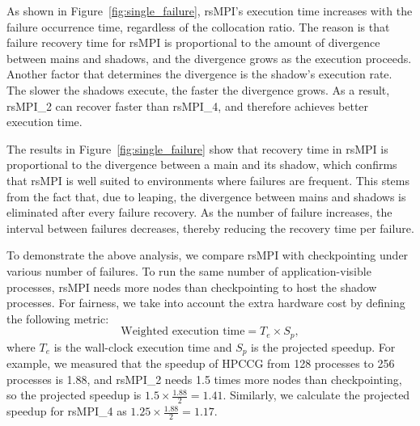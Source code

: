 As shown in Figure~\ref{fig:single_failure}, rsMPI's execution time increases with the failure occurrence time, regardless of the collocation ratio. The reason is that failure recovery time for rsMPI is proportional to the amount of divergence between mains and shadows, and the divergence grows as the execution proceeds. 
Another factor that determines the divergence is the shadow's execution rate. The slower the shadows execute, the faster the divergence grows. As a result, rsMPI\_2 can recover faster than rsMPI\_4, and therefore achieves better execution time.


The results in Figure~\ref{fig:single_failure} show that recovery time in rsMPI is proportional to the divergence between a main and its shadow,  which confirms that rsMPI is well suited to environments where failures are frequent. 
This stems from the fact that, due to leaping, the divergence between mains and shadows is eliminated after every failure recovery. As the number of failure increases, the interval between failures decreases, thereby reducing the recovery time per failure.

To demonstrate the above analysis, we compare rsMPI with checkpointing under various number of failures. To run the same number of application-visible processes, rsMPI needs more nodes than checkpointing to host the shadow processes. For fairness, we take into account the extra hardware cost by defining the following metric:
$$\text{Weighted execution time} = T_e \times S_p,$$ where $T_e$ is the wall-clock execution time and $S_p$ is the projected speedup. For example, we measured that the speedup of HPCCG from 128 processes to 256 processes is 1.88, and rsMPI\_2 needs 1.5 times more nodes than checkpointing, so the projected speedup is $1.5\times\frac{1.88}{2}=1.41$. Similarly, we calculate the projected speedup for rsMPI\_4 as $1.25\times\frac{1.88}{2}=1.17$.

